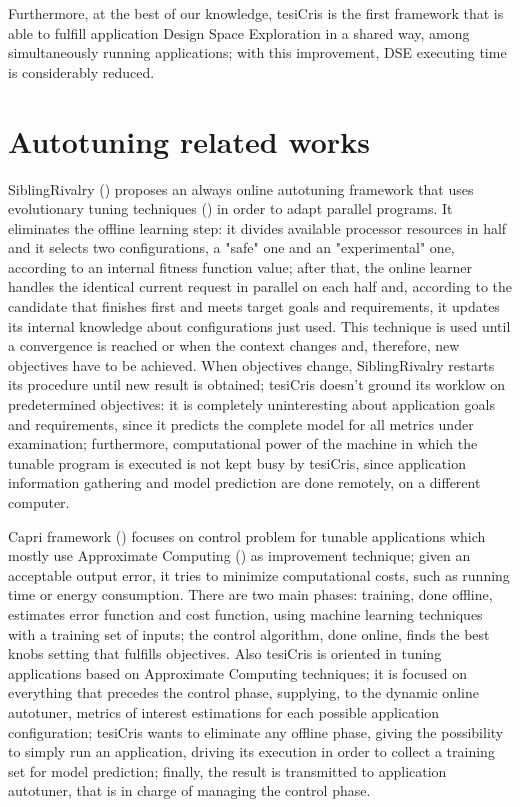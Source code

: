 Furthermore, at the best of our knowledge, tesiCris is the first framework that is able to fulfill application Design Space Exploration in a shared way, among simultaneously running applications; with this improvement, DSE executing time is considerably reduced. 

\section{Autotuning related works}

SiblingRivalry (\cite{ansel2012siblingrivalry}) proposes an always online autotuning framework that uses evolutionary tuning techniques (\cite{coello2007evolutionary}) in order to adapt parallel programs. It eliminates the offline learning step: it divides available processor resources in half and it selects two configurations, a "safe" one and an "experimental" one, according to an internal fitness function value; after that, the online learner handles the identical current request in parallel on each half and, according to the candidate that finishes first and meets target goals and requirements, it updates its internal knowledge about configurations just used. This technique is used until a convergence is reached or when the context changes and, therefore, new objectives have to be achieved. When objectives change, SiblingRivalry restarts its procedure until new result is obtained; tesiCris doesn't ground its worklow on predetermined objectives: it is completely uninteresting about application goals and requirements, since it predicts the complete model for all metrics under examination; furthermore, computational power of the machine in which the tunable program is executed is not kept busy by tesiCris, since application information gathering and model prediction are done remotely, on a different computer.

Capri framework (\cite{sui2016proactive}) focuses on control problem for tunable applications which mostly use Approximate Computing (\cite{mittal2016survey}) as improvement technique; given an acceptable output error, it tries to minimize computational costs, such as running time or energy consumption. There are two main phases: training, done offline, estimates error function and cost function, using machine learning techniques with a training set of inputs; the control algorithm, done online, finds the best knobs setting that fulfills objectives. Also tesiCris is oriented in tuning applications based on Approximate Computing techniques; it is focused on everything that precedes the control phase, supplying, to the dynamic online autotuner, metrics of interest estimations for each possible application configuration; tesiCris wants to eliminate any offline phase, giving the possibility to simply run an application, driving its execution in order to collect a training set for model prediction; finally, the result is transmitted to application autotuner, that is in charge of managing the control phase.

